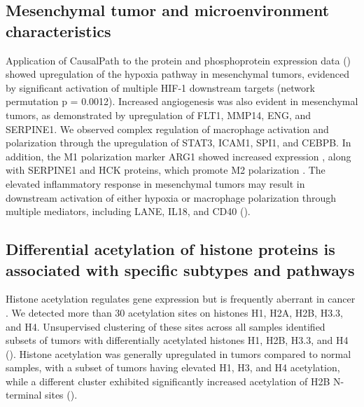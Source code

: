 \subsection{Mesenchymal tumor and microenvironment characteristics}
Application of CausalPath \cite{baburo_demire:CausalInteractions2018} to the protein and phosphoprotein expression data () showed upregulation of the hypoxia pathway in mesenchymal tumors, evidenced by significant activation of multiple HIF-1 downstream targets (network permutation p = 0.0012). Increased angiogenesis was also evident in mesenchymal tumors, as demonstrated by upregulation of FLT1, MMP14, ENG, and SERPINE1. We observed complex regulation of macrophage activation and polarization through the upregulation of STAT3, ICAM1, SPI1, and CEBPB. In addition, the M1 polarization marker ARG1 showed increased expression \cite{arlauckassp_weisslederr:Arg1Expression2018}, along with SERPINE1 and HCK proteins, which promote M2 polarization \cite{kubalamh_declerckya:PlasminogenActivator2018}. The elevated inflammatory response in mesenchymal tumors may result in downstream activation of either hypoxia or macrophage polarization through multiple mediators, including LANE, IL18, and CD40 ().


\subsection{Differential acetylation of histone proteins is associated with specific subtypes and pathways}
Histone acetylation regulates gene expression but is frequently aberrant in cancer \cite{eberhartera_beckerpb:HistoneAcetylation2002}. We detected more than 30 acetylation sites on histones H1, H2A, H2B, H3.3, and H4. Unsupervised clustering of these sites across all samples identified subsets of tumors with differentially acetylated histones H1, H2B, H3.3, and H4 (). Histone acetylation was generally upregulated in tumors compared to normal samples, with a subset of tumors having elevated H1, H3, and H4 acetylation, while a different cluster exhibited significantly increased acetylation of H2B N-terminal sites ().

